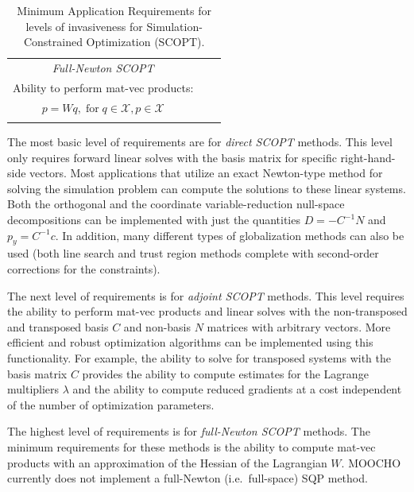 \documentclass[pdf,12pt,report]{SANDreport}
\begin{document}
{\begin{table}
{\begin{center}
\begin{tabular}{|c|c|l|}
\begin{minipage}{70ex}
\end{minipage} \\
\hline
{}\textit{Full-Newton SCOPT}
& \begin{minipage}{70ex}
\hspace{0in}\\
Ability to perform mat-vec products:\\
$p = W q, \; \mbox{for} \; q \in \mathcal{X}, p \in \mathcal{X}$ \\
\end{minipage} \\
\hline
\end{tabular}
\end{center}}
\caption[Minimum Application Requirements for levels of invasiveness
 for Simulation-Constrained Optimization (SCOPT)]{
\label{moocho:tbl:SCOPT_requirements}
Minimum Application Requirements for levels of invasiveness for
Simulation-Constrained Optimization (SCOPT).  }
\end{table}
\esinglespace}

The most basic level of requirements are for \textit{direct SCOPT} methods.
This level only requires forward linear solves with the basis matrix for
specific right-hand-side vectors.  Most applications that utilize an exact
Newton-type method for solving the simulation problem can compute the
solutions to these linear systems.  Both the orthogonal and the coordinate
variable-reduction null-space decompositions can be implemented with just the
quantities $D = -C^{-1} N$ and $p_y = C^{-1} c$.  In addition, many different
types of globalization methods can also be used (both line search and trust
region methods complete with second-order corrections for the constraints).

The next level of requirements is for \textit{adjoint SCOPT} methods.  This
level requires the ability to perform mat-vec products and linear solves with
the non-transposed and transposed basis $C$ and non-basis $N$ matrices with
arbitrary vectors.  More efficient and robust optimization algorithms can be
implemented using this functionality.  For example, the ability to solve for
transposed systems with the basis matrix $C$ provides the ability to compute
estimates for the Lagrange multipliers $\lambda$ and the ability to compute
reduced gradients at a cost independent of the number of optimization
parameters.

The highest level of requirements is for \textit{full-Newton SCOPT} methods.
The minimum requirements for these methods is the ability to compute mat-vec
products with an approximation of the Hessian of the Lagrangian $W$.  MOOCHO
currently does not implement a full-Newton (i.e.\ full-space) SQP method.
\end{document}
